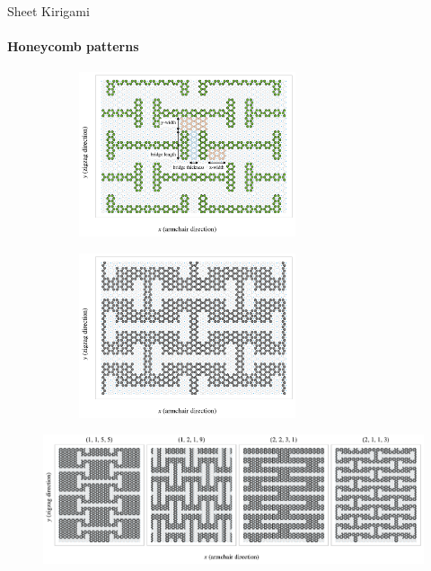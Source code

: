 \documentclass[
	10pt, %
]{beamer}
\begin{document}
%
%
\begin{frame}{Sheet Kirigami}
	\framesubtitle{Honeycomb patterns}

	\begin{figure}[H]
		\centering
		\begin{subfigure}[t]{0.48\textwidth}
			\centering
			\raggedleft
			\includegraphics[width=0.7\textwidth]{../thesis/figures/system/honeycomb_inverse.pdf}
		  \end{subfigure}
		  \hfill
		  \begin{subfigure}[t]{0.48\textwidth}
			\centering
			\raggedright
			\includegraphics[width=0.7\textwidth]{../thesis/figures/system/honeycomb_pattern.pdf}
		\end{subfigure}
	  \end{figure}
	  
	  
	  \begin{figure}[H]
		\centering
		\includegraphics[width=\linewidth]{../thesis/figures/system/honeycomb_flavors.pdf}
	  \end{figure}
\end{frame}
\end{document}
